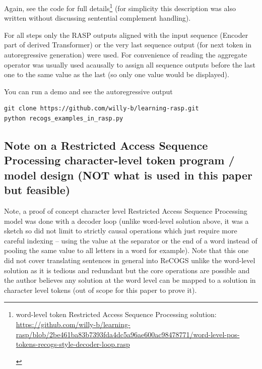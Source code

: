 \documentclass[11pt]{article}
\begin{document}
Again, see the code for full details\footnote{\begin{footnotesize}word-level token Restricted Access Sequence Processing solution: \href{https://github.com/willy-b/learning-rasp/blob/2be461ba83b7393fda4dc5a96ae600ac98478771/word-level-pos-tokens-recogs-style-decoder-loop.rasp}{https://github.com/willy-b/learning-rasp/blob/2be461ba83b7393fda4dc5a96ae600ac98478771/word-level-pos-tokens-recogs-style-decoder-loop.rasp} \end{footnotesize}} (for simplicity this description was also written without discussing sentential complement handling).

For all steps only the RASP outputs aligned with the input sequence (Encoder part of derived Transformer) or the very last sequence output (for next token in autoregressive generation) were used. For convenience of reading the aggregate operator was usually used acausally to assign all sequence outputs before the last one to the same value as the last (so only one value would be displayed).

You can run a demo and see the autoregressive output 

\begin{tiny}
\begin{verbatim}
git clone https://github.com/willy-b/learning-rasp.git
python recogs_examples_in_rasp.py
\end{verbatim}
\end{tiny}

\clearpage

\subsection{Note on a Restricted Access Sequence Processing character-level token program / model design (NOT what is used in this paper but feasible)}
\label{rasp_character_level_model_notes}

Note, a proof of concept character level Restricted Access Sequence Processing model was done with a decoder loop (unlike word-level solution above, it was a sketch so did not limit to strictly causal operations which just require more careful indexing -- using the value at the separator or the end of a word instead of pooling the same value to all letters in a word for example). Note that this one did not cover translating sentences in general into ReCOGS unlike the word-level solution as it is tedious and redundant but the core operations are possible and the author believes any solution at the word level can be mapped to a solution in character level tokens (out of scope for this paper to prove it).
\end{document}

